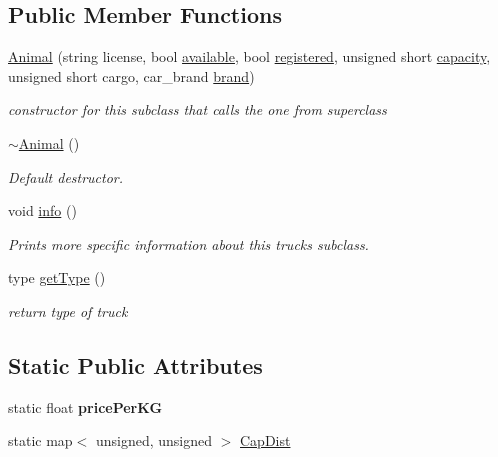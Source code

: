 \subsection*{Public Member Functions}
\begin{DoxyCompactItemize}
\item 
\hyperlink{class_animal_a6718d601daac5572ce4d64e0cc712c01}{Animal} (string license, bool \hyperlink{class_truck_a4189fe5ed32f6084459a9c5ae1eb7c2a}{available}, bool \hyperlink{class_truck_a80b8405cf7a15b236fef70116f99c4fb}{registered}, unsigned short \hyperlink{class_truck_ab004524786ae7aebf7c7bdb5e1599696}{capacity}, unsigned short cargo, car\+\_\+brand \hyperlink{class_truck_a4e30b27a9898eba7ac8404d25cbdd265}{brand})
\begin{DoxyCompactList}\small\item\em constructor for this subclass that calls the one from superclass \end{DoxyCompactList}\item 
\hyperlink{class_animal_a476af25adde5f0dfa688129c8f86fa5c}{$\sim$\+Animal} ()
\begin{DoxyCompactList}\small\item\em Default destructor. \end{DoxyCompactList}\item 
void \hyperlink{class_animal_a1e99083943239209f4fbe79380ea5991}{info} ()
\begin{DoxyCompactList}\small\item\em Prints more specific information about this truck\textquotesingle{}s subclass. \end{DoxyCompactList}\item 
type \hyperlink{class_animal_a6e7f8a4a7e8e9571218e3650a0803c03}{get\+Type} ()
\begin{DoxyCompactList}\small\item\em return type of truck \end{DoxyCompactList}\end{DoxyCompactItemize}
\subsection*{Static Public Attributes}
\begin{DoxyCompactItemize}
\item 
\mbox{\label{class_animal_aa421a3d5192279ca552a62ab3e0517c2}} 
static float {\bfseries price\+Per\+KG}
\item 
static map$<$ unsigned, unsigned $>$ \hyperlink{class_animal_a6109c3aa008a556ed43318ae4bcf33a2}{Cap\+Dist}
\end{DoxyCompactItemize}
